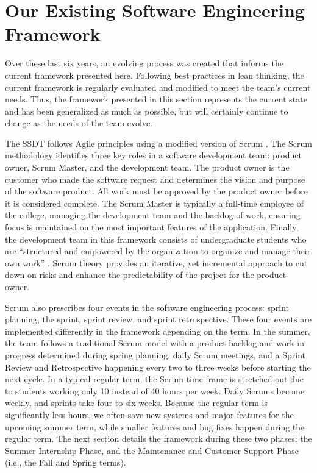 \section{Our Existing Software Engineering Framework}

Over these last six years, an evolving process was created that informs the current framework presented here. Following best practices in lean thinking, the current framework is regularly evaluated and modified to meet the team's current needs. Thus, the framework presented in this section represents the current state and has been generalized as much as possible, but will certainly continue to change as the needs of the team evolve.

The SSDT follows Agile principles \cite{agilemanifesto} using a modified version of Scrum \cite{thescrumguide}. The Scrum methodology identifies three key roles in a software development team: product owner, Scrum Master, and the development team. The product owner is the customer who made the software request and determines the vision and purpose of the software product. All work must be approved by the product owner before it is considered complete. The Scrum Master is typically a full-time employee of the college, managing the development team and the backlog of work, ensuring focus is maintained on the most important features of the application. Finally, the development team in this framework consists of undergraduate students who are ``structured and empowered by the organization to organize and manage their own work'' \cite{thescrumguide}. Scrum theory provides an iterative, yet incremental approach to cut down on risks and enhance the predictability of the project for the product owner.

Scrum also prescribes four events in the software engineering process: sprint planning, the sprint, sprint review, and sprint retrospective. These four events are implemented differently in the framework depending on the term. In the summer, the team follows a traditional Scrum model with a product backlog and work in progress determined during spring planning, daily Scrum meetings, and a Sprint Review and Retrospective happening every two to three weeks before starting the next cycle. In a typical regular term, the Scrum time-frame is stretched out due to students working only 10 instead of 40 hours per week. Daily Scrums become weekly, and sprints take four to six weeks. Because the regular term is significantly less hours, we often save new systems and major features for the upcoming summer term, while smaller features and bug fixes happen during the regular term. The next section details the framework during these two phases: the Summer Internship Phase, and the Maintenance and Customer Support Phase (i.e., the Fall and Spring terms).

